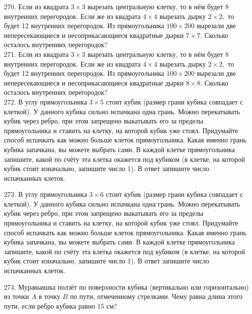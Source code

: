 270. Если из квадрата $3\times3$ вырезать центральную клетку, то в нём будет 8 внутренних перегородок. Если же из квадрата $4\times4$ вырезать дырку $2\times2,$ то будет 12 внутренних перегородок. Из прямоугольника $100\times200$ вырезали две непересекающиеся и несоприкасающиеся квадратные дырки $7\times7.$ Сколько осталось внутренних перегородок?\\
271. Если из квадрата $3\times3$ вырезать центральную клетку, то в нём будет 8 внутренних перегородок. Если же из квадрата $4\times4$ вырезать дырку $2\times2,$ то будет 12 внутренних перегородок. Из прямоугольника $100\times200$ вырезали две непересекающиеся и несоприкасающиеся квадратные дырки $8\times8.$ Сколько осталось внутренних перегородок?\\
272. В углу прямоугольника $3\times5$ стоит кубик (размер грани кубика совпадает с клеткой). У данного кубика сильно испачкана одна грань. Можно перекатывать кубик через ребро, при этом запрещено выкатывать его за пределы прямоугольника и ставить на клетку, на которой кубик уже стоял. Придумайте способ испачкать как можно больше клеток прямоугольника. Какая именно грань кубика запачкана, вы можете выбрать сами. В каждой клетке прямоугольника запишите, какой по счёту эта клетка окажется под кубиком (в клетке, на которой кубик стоит изначально, запишите число 1). В ответ запишите число испачканных клеток.
\begin{center}
\begin{figure}[ht!]
\end{figure}
\end{center}
273. В углу прямоугольника $3\times6$ стоит кубик (размер грани кубика совпадает с клеткой). У данного кубика сильно испачкана одна грань. Можно перекатывать кубик через ребро, при этом запрещено выкатывать его за пределы прямоугольника и ставить на клетку, на которой кубик уже стоял. Придумайте способ испачкать как можно больше клеток прямоугольника. Какая именно грань кубика запачкана, вы можете выбрать сами. В каждой клетке прямоугольника запишите, какой по счёту эта клетка окажется под кубиком (в клетке, на которой кубик стоит изначально, запишите число 1). В ответ запишите число испачканных клеток.
\begin{center}
\begin{figure}[ht!]
\end{figure}
\end{center}
274. Муравьишка ползёт по поверхности кубика (вертикально или горизонтально) из точки $A$ в точку $B$ по пути, отмеченному стрелками. Чему равна длина этого пути, если ребро кубика равно 15 см?
